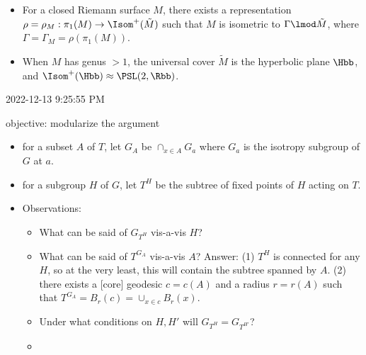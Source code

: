 \documentclass{amsart}
\begin{document}
\begin{itemize}
	\item For a closed Riemann surface $M$, there exists a representation $\rho=\rho_M : \pi_1(M) \to \Isom^+(\tilde{M})$ such that $M$ is isometric to $\Gamma \lmod \tilde{M}$, where $\Gamma=\Gamma_M = \rho(\pi_1(M))$. 
	\item When $M$ has genus $>1$, the universal cover $\tilde{M}$ is the hyperbolic plane $\Hbb$, and $\Isom^+(\Hbb) \approx \PSL(2,\Rbb)$. 
\end{itemize}
2022-12-13 9:25:55 PM

objective: modularize the argument
\begin{itemize}
	\item for a subset $A$ of $T$, let $G_A$ be $\cap_{x \in A}G_a$ where $G_a$ is the isotropy subgroup of $G$ at $a$. 
	\item for a subgroup $H$ of $G$, let $T^H$ be the subtree of fixed points of $H$ acting on $T$. 
	\item Observations:
	\begin{itemize}
		\item What can be said of $G_{T^H}$ vis-a-vis $H$? 
		\item What can be said of $T^{G_A}$ vis-a-vis $A$?  Answer: (1) $T^H$ is connected for any $H$, so at the very least, this will contain the subtree spanned by $A$.  (2) there exists a [core] geodesic $c=c(A)$ and a radius $r=r(A)$ such that $T^{G_A} = B_r(c) = \cup_{x \in c} B_r(x)$.    
		\item Under what conditions on $H, H'$ will $G_{T^H} = G_{T^{H'}}$? 
		\item 
	\end{itemize}
\end{itemize}
\end{document}
